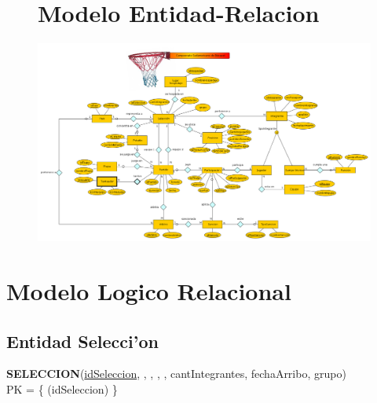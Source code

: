 \documentclass[11pt, a4paper, spanish]{article}
\begin{document}
\begin{figure}
\section{Modelo Entidad-Relacion}
  \centering
	\includegraphics[scale=0.42]{diagramas/DiagramaMER.png}\\
\end{figure}


\newpage 
\section{Modelo Logico Relacional}
\label{sec:MR}

\subsection{Entidad Selecci'on}
\textbf{SELECCION}(\underline{idSeleccion}, , , , , cantIntegrantes, fechaArribo, grupo)\\

PK = \{ (idSeleccion) \}\\
\\
\\

\end{document}
